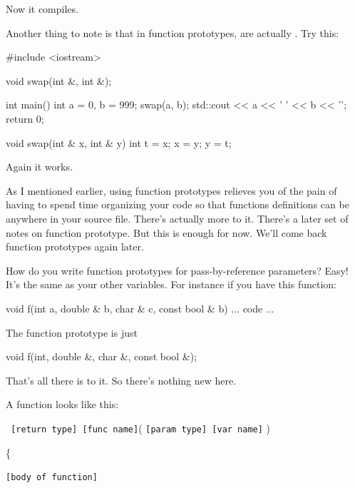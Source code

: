 Now it compiles.

Another thing to note is that in function prototypes,  are actually . Try this:

\begin{consolethree}[escapeinside=||]
#include <iostream>

void swap(int &, int &);

int main()
{
    int a = 0, b = 999;
    swap(a, b);
    std::cout << a << ' ' << b << '\n';
    return 0;
}

void swap(int & x, int & y)
{
    int t = x;
    x = y;
    y = t;
}
\end{consolethree}

Again it works.

As I mentioned earlier, using function prototypes relieves you of the
pain of having to spend time organizing your code so that functions
definitions can be anywhere in your source file. There's actually more
to it. There's a later set of notes on function prototype. But this is
enough for now. We'll come back function prototypes again later.

How do you write function prototypes for pass-by-reference parameters?
Easy! It's the same as your other variables. For
instance if you have this function:

\begin{consolethree}[escapeinside=||]
void f(int a, double & b, char & c, const bool & b)
{
    ... code ...
}
\end{consolethree}

The function prototype is just

\begin{consolethree}[escapeinside=||]
void f(int, double &, char &, const bool &);
\end{consolethree}

That's all there is to it. So there's nothing new here.






\newpage{}

A function looks like this:

\texttt{ [return type] [func name]}( \texttt{[param type] [var name]} )

\{

\texttt{[body of function]}

